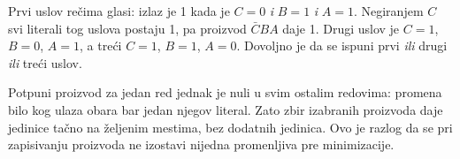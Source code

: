 
Prvi uslov rečima glasi: izlaz je 1 kada je \(C=0\) \emph{i} \(B=1\) \emph{i} \(A=1\). Negiranjem \(C\) svi literali tog uslova postaju 1, pa proizvod \(\bar CBA\) daje 1. Drugi uslov je \(C=1\), \(B=0\), \(A=1\), a treći \(C=1\), \(B=1\), \(A=0\). Dovoljno je da se ispuni prvi \emph{ili} drugi \emph{ili} treći uslov.

Potpuni proizvod za jedan red jednak je nuli u svim ostalim redovima: promena bilo kog ulaza obara bar jedan njegov literal. Zato zbir izabranih proizvoda daje jedinice tačno na željenim mestima, bez dodatnih jedinica. Ovo je razlog da se pri zapisivanju proizvoda ne izostavi nijedna promenljiva pre minimizacije.
